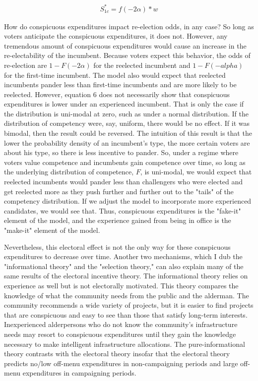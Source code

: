 \begin{align}
    S_{1c}^*=f(-2\alpha)*w
\end{align}

How do conspicuous expenditures impact re-election odds, in any case? So long as voters anticipate the conspicuous expenditures, it does not. 
However, any tremendous amount of conspicuous expenditures would cause an increase in the re-electability of the incumbent. 
Because voters expect this behavior, the odds of re-election are $1-F(-2 \alpha)$ for the reelected incumbent and $1-F(-alpha)$ for the first-time incumbent. 
The model also would expect that reelected incumbents pander less than first-time incumbents and are more likely to be reelected. 
However, equation 6 does not necessarily show that conspicuous expenditures is lower under an experienced incumbent. 
That is only the case if the distribution is uni-modal at zero, such as under a normal distribution. 
If the distribution of competency were, say, uniform, there would be no effect. 
If it was bimodal, then the result could be reversed. 
The intuition of this result is that the lower the probability density of an incumbent's type, the more certain voters are about his type, so there is less incentive to pander. 
So, under a regime where voters value competence and incumbents gain competence over time, so long as the underlying distribution of competence, $F$, is uni-modal, we would expect that reelected incumbents would pander less than challengers who were elected and get reelected more as they push further and further out to the "tails" of the competency distribution. 
If we adjust the model to incorporate more experienced candidates, we would see that. 
 Thus, conspicuous expenditures is the "fake-it" element of the model, and the experience gained from being in office is the "make-it" element of the model. 

Nevertheless, this electoral effect is not the only way for these conspicuous expenditures to decrease over time. 
Another two mechanisms, which I dub the "informational theory" and the "selection theory," can also explain many of the same results of the electoral incentive theory. 
The informational theory relies on experience as well but is not electorally motivated. 
This theory compares the knowledge of what the community needs from the public and the alderman. 
The community recommends a wide variety of projects, but it is easier to find projects that are conspicuous and easy to see than those that satisfy long-term interests. 
Inexperienced alderpersons who do not know the community's infrastructure needs may resort to conspicuous expenditures until they gain the knowledge necessary to make intelligent infrastructure allocations. 
The pure-informational theory contrasts with the electoral theory insofar that the electoral theory predicts no/low off-menu expenditures in non-campaigning periods and large off-menu expenditures in campaigning periods. 

